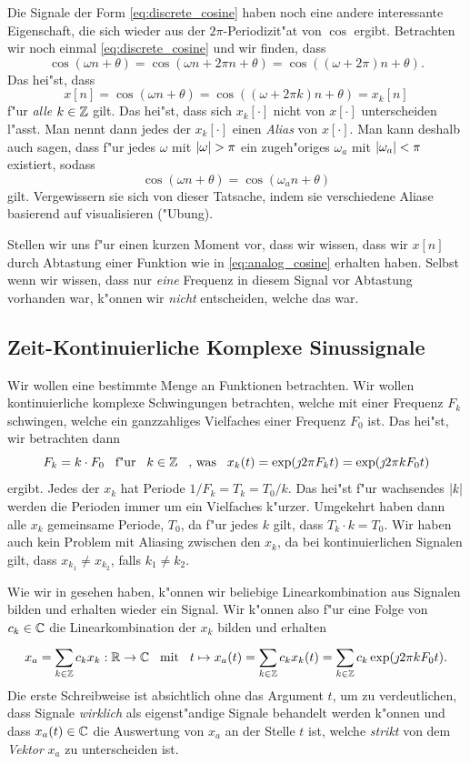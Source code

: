 Die Signale der Form \eqref{eq:discrete_cosine} haben noch eine andere interessante Eigenschaft, die sich wieder aus der $2\pi$-Periodizit"at von $\cos$ ergibt. 
Betrachten wir noch einmal \eqref{eq:discrete_cosine} und wir finden, dass
\[
\cos(\omega n + \theta) = \cos(\omega n + 2\pi n + \theta) = \cos((\omega + 2\pi) n + \theta).
\]
Das hei"st, dass
\[
    x[n] = \cos(\omega n + \theta) = \cos((\omega + 2\pi k) n + \theta) = x_k[n]
\]
f"ur \emph{alle} $k \in \mathbb{Z}$ gilt.
Das hei"st, dass sich $x_k[\cdot]$ nicht von $x[\cdot]$ unterscheiden l"asst.
Man nennt dann jedes der $x_k[\cdot]$ einen \emph{Alias} von $x[\cdot]$.
Man kann deshalb auch sagen, dass f"ur jedes $\omega$ mit ${\left| \omega \right|} > \pi$ ein zugeh"origes $\omega_a$ mit ${\left| \omega_a \right|} < \pi$ existiert, sodass
\[
    \cos(\omega n + \theta) = \cos(\omega_a n + \theta)
\]
gilt.
Vergewissern sie sich von dieser Tatsache, indem sie verschiedene Aliase basierend auf  visualisieren ("Ubung).

Stellen wir uns f"ur einen kurzen Moment vor, dass wir wissen, dass wir $x[n]$ durch Abtastung einer Funktion wie in \eqref{eq:analog_cosine} erhalten haben.
Selbst wenn wir wissen, dass nur \emph{eine} Frequenz in diesem Signal vor Abtastung vorhanden war, k"onnen wir \emph{nicht} entscheiden, welche das war.
%
\FloatBarrier
%
\subsection{Zeit-Kontinuierliche Komplexe Sinussignale}\label{sec:cont_complex_harm}
%
Wir wollen eine bestimmte Menge an Funktionen betrachten. Wir wollen kontinuierliche komplexe Schwingungen betrachten, welche mit einer Frequenz $F_k$ schwingen, welche ein ganzzahliges Vielfaches einer Frequenz $F_0$ ist.
Das hei"st, wir betrachten dann
\[
F_k = k \cdot F_0 {\hspace{3mm} \text{f"ur} \hspace{3mm}} k \in \mathbb{Z} {\hspace{3mm} \text{, was} \hspace{3mm}}
x_k(t) = \exp(\jmath 2 \pi F_k t) = \exp(\jmath 2 \pi k F_0 t)
\]
ergibt. 
Jedes der $x_k$ hat Periode $1/F_k = T_k = T_0/k$. 
Das hei"st f"ur wachsendes ${\left| k \right|}$ werden die Perioden immer um ein Vielfaches k"urzer. 
Umgekehrt haben dann alle $x_k$ gemeinsame Periode, $T_0$, da f"ur jedes $k$ gilt, dass $T_k \cdot k = T_0$.
Wir haben auch kein Problem mit Aliasing zwischen den $x_k$, da bei kontinuierlichen Signalen gilt, dass $x_{k_1} \neq x_{k_2}$, falls $k_1 \neq k_2$.

Wie wir in  gesehen haben, k"onnen wir beliebige Linearkombination aus Signalen bilden und erhalten wieder ein Signal.
Wir k"onnen also f"ur eine Folge von $c_k \in \mathbb{C}$ die Linearkombination der $x_k$ bilden und erhalten
%
\begin{equation}\label{eq:cont_fourier_series}
    x_a = {\sum\limits_{k \in \mathbb{Z}}^{}{c_k x_k}} : \mathbb{R} \rightarrow \mathbb{C}
    {\hspace{3mm} \text{mit} \hspace{3mm}} 
    t \mapsto x_a(t) = {\sum\limits_{k \in \mathbb{Z}}^{}{c_k x_k(t)}}
        = {\sum\limits_{k \in \mathbb{Z}}^{}{c_k \exp(\jmath 2 \pi k F_0 t)}}.
\end{equation}
%
Die erste Schreibweise ist absichtlich ohne das Argument $t$, um zu verdeutlichen, dass Signale \emph{wirklich} als eigenst"andige Signale behandelt werden k"onnen und dass $x_a(t) \in \mathbb{C}$  die Auswertung von $x_a$ an der Stelle $t$ ist, welche \emph{strikt} von dem \emph{Vektor} $x_a$ zu unterscheiden ist.

